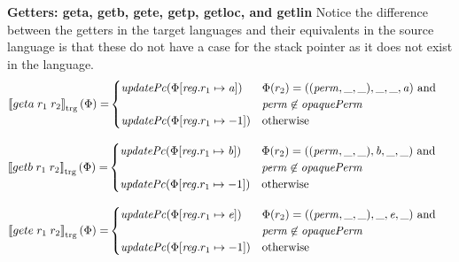 \documentclass[a4paper]{article}
\newcommand{\sem}[1]{\left\llbracket #1 \right\rrbracket}
\newcommand{\tsem}[2][\Phi]{\sem{#2}_{\mathrm{trg}}(#1)}
\newcommand{\tand}{\text{ and }}
\newcommand{\totherwise}{\text{otherwise }}
\newcommand{\targetcolor}[1]{\color{black}}
\newcommand{\trg}[1]{{\targetcolor{} #1}}
\newcommand{\zinstr}[1]{#1}
\newcommand{\twoinstr}[3]{
  \ifthenelse{\equal{#2#3}{}}
  {\zinstr{#1}}
  {\zinstr{#1} \; #2 \; #3}
}
\newcommand{\tgeta}[2]{\twoinstr{\trg{geta}}{#1}{#2}}
\newcommand{\tgetb}[2]{\twoinstr{\trg{getb}}{#1}{#2}}
\newcommand{\tgete}[2]{\twoinstr{\trg{gete}}{#1}{#2}}
\newcommand{\update}[2]{[#1 \mapsto #2]}
\newcommand{\updReg}[2]{\update{\reg.#1}{#2}}
\newcommand{\perm}{\var{perm}}
\newcommand{\var}[1]{\mathit{#1}}
\newcommand{\reg}{\var{reg}}
\newcommand{\baddr}{\var{b}}
\newcommand{\eaddr}{\var{e}}
\newcommand{\aaddr}{\var{a}}
\newcommand{\plainfun}[2]{
  \ifthenelse{\equal{#2}{}}
  {\mathit{#1}}
  {\mathit{#1}(#2)}
}
\newcommand{\updPcAddr}[1]{\plainfun{updatePc}{#1}}
\newcommand{\opaquePerm}[1]{\plainfun{opaquePerm}{#1}}
\begin{document}
\textbf{Getters: geta, getb, gete, getp, getloc, and getlin}
Notice the difference between the getters in the target languages and their equivalents in the source language is that these do not have a case for the stack pointer as it does not exist in the language.
\begin{align*}
  \tsem{\tgeta{r_1}{r_2}} = &
                              \begin{cases}
                                \updPcAddr{\Phi\update{\reg.r_1}{\aaddr}} & 
                                \arraycolsep=0pt
                                \begin{array}[t]{l}
                                  \Phi(r_2) = ((\perm,\_,\_),\_,\_,\aaddr) \tand \\
                                  \perm \not\in \opaquePerm{}
                                \end{array} \\
                                \updPcAddr{\Phi\updReg{r_1}{-1}} & \totherwise
                              \end{cases}
\end{align*}

\begin{align*}
  \tsem{\tgetb{r_1}{r_2}} = &
                              \begin{cases}
                                \updPcAddr{\Phi\update{\reg.r_1}{\baddr}} & 
                                \arraycolsep=0pt
                                \begin{array}[t]{l}
                                  \Phi(r_2) = ((\perm,\_,\_),\baddr,\_,\_) \tand \\
                                  \perm \not\in \opaquePerm{}
                                \end{array} \\
                                \updPcAddr{\Phi\updReg{r_1}{-1}} & \totherwise
                              \end{cases}
\end{align*}

\begin{align*}
  \tsem{\tgete{r_1}{r_2}} = &
                              \begin{cases}
                                \updPcAddr{\Phi\update{\reg.r_1}{\eaddr}} & 
                                \arraycolsep=0pt
                                \begin{array}[t]{l}
                                  \Phi(r_2) = ((\perm,\_,\_),\_,\eaddr,\_) \tand \\
                                  \perm \not\in \opaquePerm{}
                                \end{array} \\
                                \updPcAddr{\Phi\updReg{r_1}{-1}} & \totherwise
                              \end{cases}
\end{align*}
\end{document}
